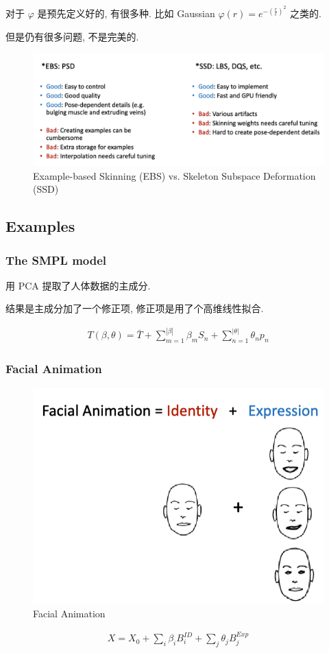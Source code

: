 对于 $\varphi$ 是预先定义好的, 有很多种. 比如 Gaussian $\varphi (r) = e^{-(\frac{r}{c})^2}$ 之类的. 
 
但是仍有很多问题, 不是完美的. 

\begin{figure}[!htb]
    \centering
    \includegraphics[width=0.88\linewidth]{pic/1057/Example-based Skinning (EBS) vs. Skeleton Subspace Deformation (SSD)}
    \caption{Example-based Skinning (EBS) vs. Skeleton Subspace Deformation (SSD)}
\end{figure}

\subsection{Examples}

\subsubsection{The SMPL model}
用 PCA 提取了人体数据的主成分. 

结果是主成分加了一个修正项, 修正项是用了个高维线性拟合. 

\begin{align*}
    T(\beta, \theta) = \bar{T} + \sum_{m=1}^{|\beta|}\beta_m S_n + \sum_{n=1}^{|\theta|}\theta_np_n
\end{align*}


\subsubsection{Facial Animation}
\begin{figure}[!htb]
    \centering
    \includegraphics[width=0.618\linewidth]{pic/1057/Facial Animation}
    \caption{Facial Animation}
\end{figure}

\begin{align*}
    X= X_0 + \sum_i \beta_i B_i^{ID} + \sum_j \theta_j B_j^{Exp}
\end{align*}